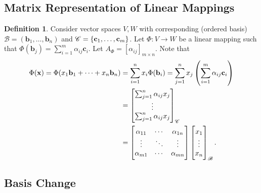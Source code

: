 \documentclass[12pt,openany]{book}
\theoremstyle{definition}
\newtheorem{definition}{Definition}[chapter]
\newcommand{\by}{\times}
\newcommand{\basis}{\mathscr{B}}
\renewcommand{\vec}[1]{\textbf{#1}}
\begin{document}
	\subsection{Matrix Representation of Linear Mappings}
	\begin{tcolorbox}[colframe=defcolor,title={\color{white}\bf Transformation Matrix}]
		\begin{definition}
			Consider vector spaces $V,W$ with corresponding (ordered basis) $\basis=(\vec{b}_1,\dots,\vec{b}_n)$ and $\mathscr{C}=\set{\vec{c}_1,\dots,\vec{c}_m}$. Let $\Phi:V\to W$ be a linear mapping such that $
			\Phi(\vec{b}_j)=\sum_{i=1}^m\alpha_{ij}\vec{c}_i.
			$ Let $A_\Phi=[\alpha_{ij}]_{m\by n}$. Note that \begin{align*}
				\Phi(\vec{x})=\Phi(x_1\vec{b}_1+\cdots+x_n\vec{b}_n)&=\sum_{i=1}^nx_i\Phi(\vec{b}_i)
				=\sum_{j=1}^nx_j\del{\sum_{i=1}^m\alpha_{ij}\vec{c}_i}\\
				&=\begin{bmatrix}
					\sum_{j=1}^n\alpha_{ij}x_j\\ \vdots\\ \sum_{j=1}^n\alpha_{ij}x_j
				\end{bmatrix}_{\mathscr{C}}\\
			&=\begin{bmatrix}
				\alpha_{11} &\cdots &\alpha_{1n}\\
				\vdots&\ddots&\vdots\\
				\alpha_{m1}&\cdots&\alpha_{mn}
			\end{bmatrix}\begin{bmatrix}
			x_1\\ \vdots\\ x_n
		\end{bmatrix}_{\basis}.
			\end{align*}
		\end{definition}
	\end{tcolorbox}
	
	\subsection{Basis Change}
	
\end{document}
